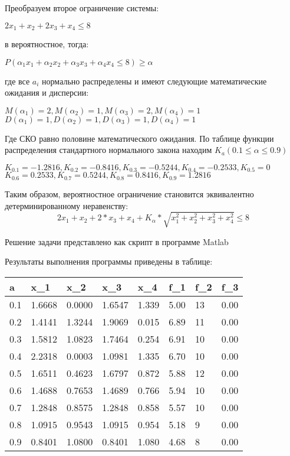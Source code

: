 \documentclass[14pt,a4paper,report]{report}
\begin{document}
Преобразуем второе ограничение системы:
\begin{center}
$2x_1+x_2+2x_3+x_4 \leq 8$
\end{center}

 в вероятностное, тогда:
\begin{center}
$P(\alpha_{1}x_{1}+\alpha_{2}x_{2}+\alpha_{3}x_{3}+\alpha_{4}x_{4} \leq 8)\geq \alpha$
\end{center}

где все $a_{i}$ нормально распределены и имеют следующие математические ожидания и дисперсии:

\begin{center}
$M(\alpha_{1})=2, M(\alpha_{2})=1, M(\alpha_{3})=2, M(\alpha_{4})=1$
$D(\alpha_{1})=1, D(\alpha_{2})=1, D(\alpha_{3})=1, D(\alpha_{4})=1$
\end{center}

Где СКО равно половине математического ожидания. По таблице функции распределения стандартного нормального закона  находим $K_a (0.1\leq \alpha\leq 0.9)$

\begin{center}
$K_{0.1}=-1.2816, 
K_{0.2}=-0.8416, 
K_{0.3}=-0.5244, 
K_{0.4}=-0.2533, 
K_{0.5}=0$
$K_{0.6}=0.2533, 
K_{0.7}=0.5244, 
K_{0.8}=0.8416, 
K_{0.9}=1.2816$
\end{center}

Таким образом, вероятностное ограничение становится эквивалентно детерминированному неравенству:	
\begin{equation}
2x_{1}+x_{2}+2*x_{3}+x_{4}+K_{\alpha}*\sqrt{x_{1}^2+x_{2}^2+x_{3}^2+x_{4}^2} \leq 8
\end{equation}

Решение задачи представлено как скрипт в программе Matlab



Результаты выполнения программы приведены в таблице:

\begin{table}[h!]
\begin{tabular}{|l|l|l|l|l|l|l|l|}
\hline
a & x_1 & x_2 & x_3 & x_4 & f_1 & f_2 & f_3\\ \hline
0.1&1.6668&0.0000&1.6547& 1.339&5.00&13&0.00\\ \hline 
0.2&1.4141&1.3244&1.9069& 0.015&6.89&11&0.00\\ \hline
0.3&1.5812&1.0823&1.7464& 0.254&6.91&10&0.00\\ \hline
0.4&2.2318&0.0003&1.0981& 1.335&6.70&10&0.00\\ \hline
0.5&1.6511&0.4623&1.6797& 0.872&5.88&12&0.00\\ \hline
0.6&1.4688&0.7653&1.4689& 0.766&5.94&10&0.00\\ \hline
0.7&1.2848&0.8575&1.2848& 0.858&5.57&10&0.00\\ \hline
0.8&1.0915&0.9543&1.0915& 0.954&5.18&9&0.00\\ \hline
0.9&0.8401&1.0800&0.8401& 1.080&4.68&8&0.00  \\ \hline
\end{tabular}
\end{table}
\end{document}
